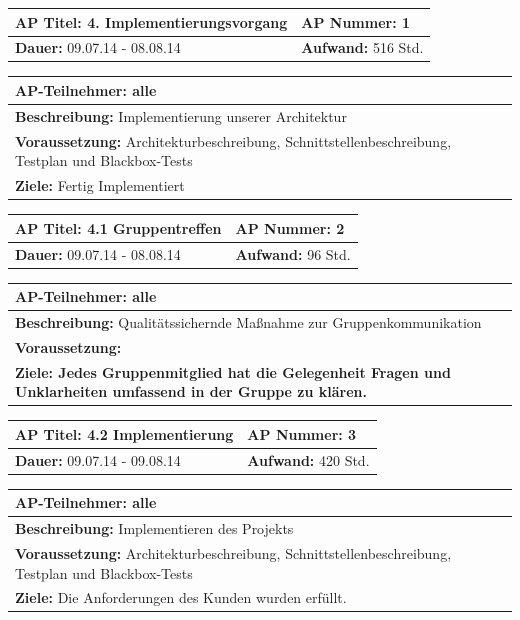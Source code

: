 \documentclass[fontsize=12pt,paper=a4,twoside]{scrartcl}
\begin{document}
\begin{tabular}{|p{7.43cm}|p{7.43cm}|}
\hline
\textbf{AP Titel: }4. Implementierungsvorgang & \textbf{AP Nummer: }1\\ 
\hline
\textbf{Dauer: }09.07.14 - 08.08.14& \textbf{Aufwand: } 516 Std.\\
\hline
\end{tabular}
\begin{tabular}{|p{15.3cm}|}
\hline
\textbf{AP-Teilnehmer: }alle\\
\hline
\textbf{Beschreibung: }Implementierung unserer Architektur\\
\hline
\textbf{Voraussetzung: }Architekturbeschreibung, Schnittstellenbeschreibung, Testplan und Blackbox-Tests \\
\hline 
\textbf{Ziele: }Fertig Implementiert\\
\hline 
\end{tabular}


\begin{tabular}{|p{7.43cm}|p{7.43cm}|}
\hline
\textbf{AP Titel: }4.1 Gruppentreffen & \textbf{AP Nummer: }2\\ 
\hline
\textbf{Dauer: }09.07.14 - 08.08.14& \textbf{Aufwand: } 96 Std.\\
\hline
\end{tabular}
\begin{tabular}{|p{15.3cm}|}
\hline
\textbf{AP-Teilnehmer: }alle\\
\hline
\textbf{Beschreibung: }Qualitätssichernde Maßnahme zur Gruppenkommunikation\\
\hline
\textbf{Voraussetzung: } \\
\hline 
\textbf{Ziele: Jedes Gruppenmitglied hat die Gelegenheit Fragen und Unklarheiten umfassend in der Gruppe zu klären.}\\
\hline 
\end{tabular}

\begin{tabular}{|p{7.43cm}|p{7.43cm}|}
\hline
\textbf{AP Titel: }4.2 Implementierung & \textbf{AP Nummer: }3\\ 
\hline
\textbf{Dauer: }09.07.14 - 09.08.14& \textbf{Aufwand: } 420 Std.\\
\hline
\end{tabular}
\begin{tabular}{|p{15.3cm}|}
\hline
\textbf{AP-Teilnehmer: }alle\\
\hline
\textbf{Beschreibung: }Implementieren des Projekts\\
\hline
\textbf{Voraussetzung: }Architekturbeschreibung, Schnittstellenbeschreibung, Testplan und Blackbox-Tests \\
\hline 
\textbf{Ziele: }Die Anforderungen des Kunden wurden erfüllt.\\
\hline 
\end{tabular}
\end{document}
